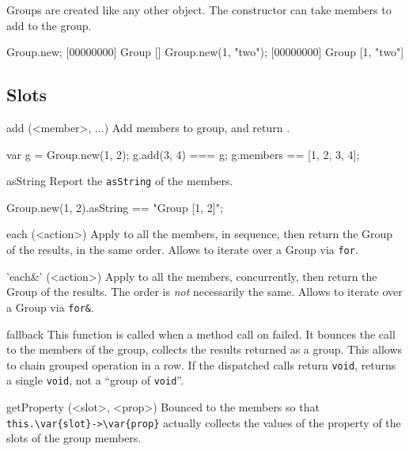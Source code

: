 Groups are created like any other object. The constructor can
take members to add to the group.

\begin{urbiscript}
Group.new;
[00000000] Group []
Group.new(1, "two");
[00000000] Group [1, "two"]
\end{urbiscript}

\subsection{Slots}

\begin{urbiscriptapi}
\item[add](<member>, ...)%
  Add members to \this group, and return \this.
\begin{urbiassert}
var g = Group.new(1, 2);
g.add(3, 4) === g;
g.members == [1, 2, 3, 4];
\end{urbiassert}

\item[asString]
  Report the \lstinline|asString| of the members.
\begin{urbiassert}
Group.new(1, 2).asString == "Group [1, 2]";
\end{urbiassert}

\item[each](<action>)%
  Apply  to all the members, in sequence, then return the
  Group of the results, in the same order.  Allows to iterate over a
  Group via \lstinline|for|.

\item['each&'](<action>)%
  Apply  to all the members, concurrently, then return the
  Group of the results.  The order is \emph{not} necessarily the same.
  Allows to iterate over a Group via \lstinline|for&|.

\item[fallback]
  This function is called when a method call on \this
  failed.  It bounces the call to the members of the group, collects
  the results returned as a group.  This allows to chain grouped
  operation in a row.  If the dispatched calls return
  \lstinline|void|, returns a single \lstinline|void|, not a ``group
  of \lstinline|void|''.

\item[getProperty](<slot>, <prop>)%
  Bounced to the members so that
  \lstinline|this.\var{slot}->\var{prop}| actually collects the values
  of the property  of the slots  of the group
  members.


\end{urbiscriptapi}
